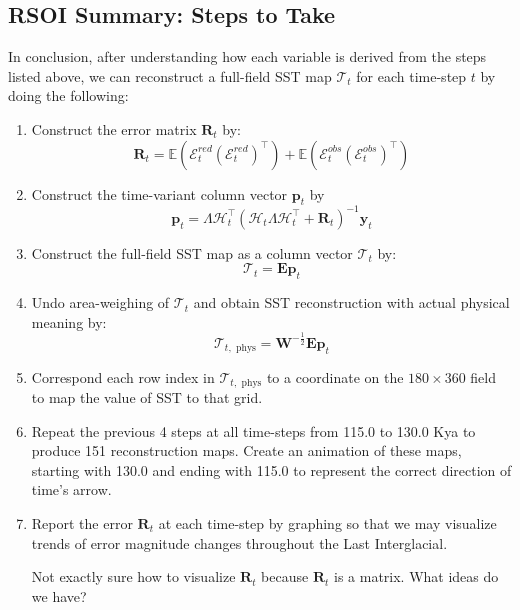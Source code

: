 \documentclass{article}
\begin{document}
\subsection{RSOI Summary: Steps to Take}
In conclusion, after understanding how each variable is derived from the steps listed above, we can reconstruct a full-field SST map $\mathcal{T}_t$ for each time-step $t$ by doing the following:
\begin{enumerate}
    \item Construct the error matrix $\textbf{R}_t$ by:
    $$\textbf{R}_t =\mathbb{E}(\mathcal{E}_t^{red} (\mathcal{E}_t^{red})^\intercal) + \mathbb{E}(\mathcal{E}_t^{obs} (\mathcal{E}_t^{obs})^\intercal)$$

    \item Construct the time-variant column vector $\textbf{p}_t$ by
    $${\textbf{p}_t} = {\Lambda \mathcal{H}_t^\intercal} ({\mathcal{H}_t \Lambda \mathcal{H}_t^\intercal} + {\textbf{R}_t})^{-1} {\textbf{y}_t}$$

    \item Construct the full-field SST map as a column vector $\mathcal{T}_t$ by:
    $$\mathcal{T}_t = \textbf{E} \textbf{p}_t$$

    \item Undo area-weighing of $\mathcal{T}_t$ and obtain SST reconstruction with actual physical meaning by:
    $$\mathcal{T}_{t, \text{ phys}} = \textbf{W}^{-\frac{1}{2}} \textbf{E} \textbf{p}_t$$

    \item Correspond each row index in $\mathcal{T}_{t, \text{ phys}}$ to a coordinate on the $180 \times 360$ field to map the value of SST to that grid.

    \item Repeat the previous 4 steps at all time-steps from 115.0 to 130.0 Kya to produce 151 reconstruction maps. Create an animation of these maps, starting with 130.0 and ending with 115.0 to represent the correct direction of time's arrow.
    
    \item Report the error $\textbf{R}_t$ at each time-step by graphing so that we may visualize trends of error magnitude changes throughout the Last Interglacial.
    
    \color{purple} Not exactly sure how to visualize $\textbf{R}_t$ because $\textbf{R}_t$ is a matrix. What ideas do we have? \color{black}

\end{enumerate}
\end{document}
